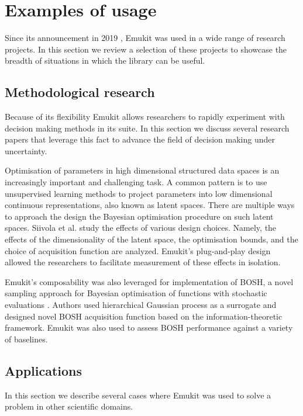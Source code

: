 
\section{Examples of usage}
Since its announcement in 2019 \cite{paleyes2019emulation}, Emukit was used in a wide range of research projects. In this section we review a selection of these projects to showcase the breadth of situations in which the library can be useful.

\subsection{Methodological research}
Because of its flexibility Emukit allows researchers to rapidly experiment with decision making methods in its suite. In this section we discuss several research papers that leverage this fact to advance the field of decision making under uncertainty.

Optimisation of parameters in high dimensional structured data spaces is an increasingly important and challenging task. A common pattern is to use unsupervised learning methods to project parameters into low dimensional continuous representations, also known as latent spaces. There are multiple ways to approach the design the Bayesian optimisation procedure on such latent spaces. Siivola et al. \cite{siivola2021good} study the effects of various design choices. Namely, the effects of the dimensionality of the latent space, the optimisation bounds, and the choice of acquisition function are analyzed. Emukit's plug-and-play design allowed the researchers to facilitate measurement of these effects in isolation.

Emukit's composability was also leveraged for implementation of BOSH, a novel sampling approach for Bayesian optimisation of functions with stochastic evaluations \cite{moss2020bosh}. Authors used hierarchical Gaussian process as a surrogate and designed novel BOSH acquisition function based on the information-theoretic framework. Emukit was also used to assess BOSH performance against a variety of baselines.


\subsection{Applications}
In this section we describe several cases where Emukit was used to solve a problem in other scientific domains.

